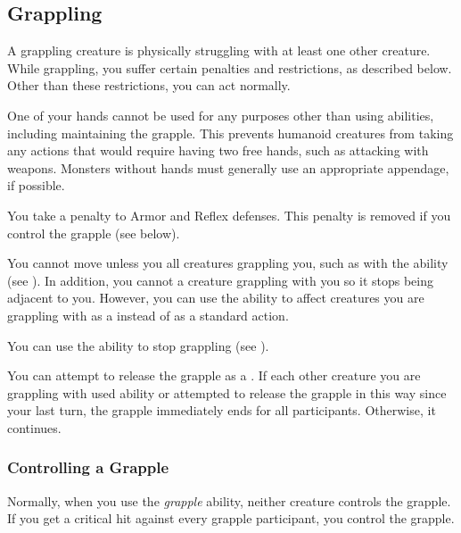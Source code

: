   \subsection{Grappling}\label{Grappling}
    A grappling creature is physically struggling with at least one other creature.
    While grappling, you suffer certain penalties and restrictions, as described below.
    Other than these restrictions, you can act normally.
    \begin{raggeditemize}
      \item One of your hands cannot be used for any purposes other than using  abilities, including maintaining the grapple.
        This prevents humanoid creatures from taking any actions that would require having two free hands, such as attacking with  weapons.
        Monsters without hands must generally use an appropriate appendage, if possible.
      \item You take a  penalty to Armor and Reflex defenses.
        This penalty is removed if you control the grapple (see below).
      \item You cannot move unless you  all creatures grappling you, such as with the  ability (see ).
        In addition, you cannot  a creature grappling with you so it stops being adjacent to you.
        However, you can use the  ability to affect creatures you are grappling with as a  instead of as a standard action.
      \item You can use the  ability to stop grappling (see ).
      \item You can attempt to release the grapple as a . If each other creature you are grappling with used  ability or attempted to release the grapple in this way since your last turn, the grapple immediately ends for all participants. Otherwise, it continues.
    \end{raggeditemize}

    \subsubsection{Controlling a Grapple}\label{Controlling a Grapple}
      Normally, when you use the \textit{grapple} ability, neither creature controls the grapple.
      If you get a critical hit against every grapple participant, you control the grapple.

